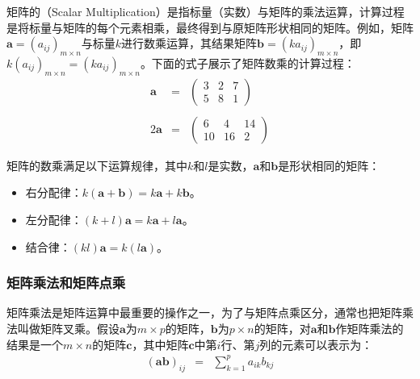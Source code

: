 \parinterval 矩阵的{\small{}}（Scalar Multiplication）是指标量（实数）与矩阵的乘法运算，计算过程是将标量与矩阵的每个元素相乘，最终得到与原矩阵形状相同的矩阵。例如，矩阵$ \mathbf a={(a_{ij})}_{m\times n} $与标量$ k $进行数乘运算，其结果矩阵$ \mathbf b={(ka_{ij})}_{m\times n} $，即$ k{(a_{ij})}_{m\times n}={(ka_{ij})}_{m\times n} $。下面的式子展示了矩阵数乘的计算过程：
\begin{eqnarray}
\mathbf a & = &
\begin{pmatrix}
   3 & 2 & 7\\
   5 & 8 & 1
\end{pmatrix}
\\ \nonumber \\
2\mathbf a & = &
\begin{pmatrix}
   6 & 4 & 14\\
   10 & 16 & 2
\end{pmatrix}
\label{eq:5-5}
\end{eqnarray}

\parinterval 矩阵的数乘满足以下运算规律，其中$ k $和$ l $是实数，$ \mathbf a $和$ \mathbf b $是形状相同的矩阵：

\begin{itemize}
\vspace{0.5em}
\item 右分配律：$ k(\mathbf a+\mathbf b)=k\mathbf a+k\mathbf b $。
\vspace{0.5em}
\item 左分配律：$ (k+l)\mathbf a=k\mathbf a+l\mathbf a $。
\vspace{0.5em}
\item 结合律：$ (kl)\mathbf a=k(l\mathbf a) $。
\end{itemize}


\subsubsection{矩阵乘法和矩阵点乘}

\parinterval 矩阵乘法是矩阵运算中最重要的操作之一，为了与矩阵点乘区分，通常也把矩阵乘法叫做矩阵叉乘。假设$ \mathbf a $为$ m\times p $的矩阵，$ \mathbf b $为$ p\times n $的矩阵，对$ \mathbf a $和$ \mathbf b $作矩阵乘法的结果是一个$ m\times n $的矩阵$ \mathbf c $，其中矩阵$ \mathbf c $中第$ i $行、第$ j $列的元素可以表示为：
\begin{eqnarray}
{(\mathbf a\mathbf b)}_{ij} &=& \sum_{k=1}^p a_{ik}b_{kj}
\label{eq:5-6}
\end{eqnarray}

